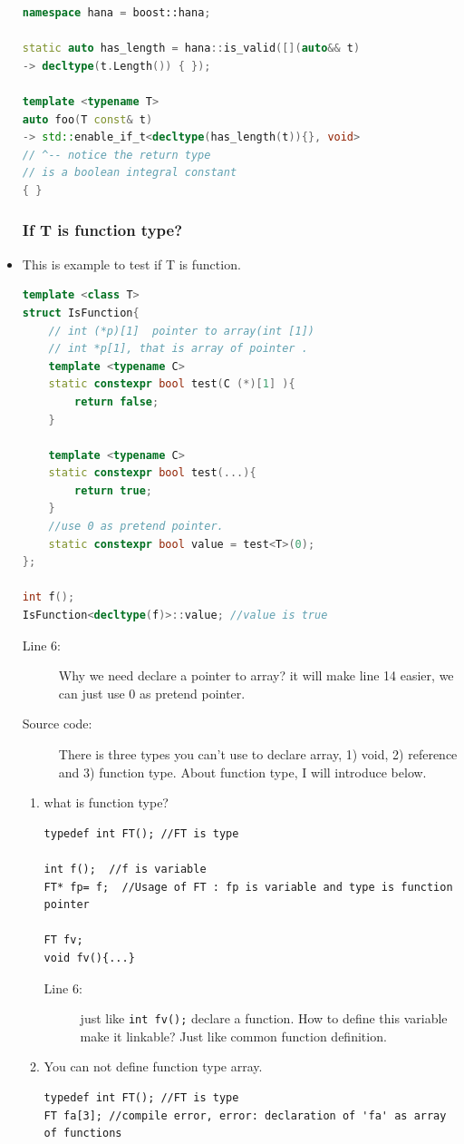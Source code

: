 \documentclass[a4paper,11pt,twoside]{book}
\begin{document}
\begin{itemize}
\begin{lstlisting}[frame=single, language=c++]
namespace hana = boost::hana;

static auto has_length = hana::is_valid([](auto&& t)
-> decltype(t.Length()) { });

template <typename T>
auto foo(T const& t)
-> std::enable_if_t<decltype(has_length(t)){}, void>
// ^-- notice the return type 
// is a boolean integral constant
{ }
\end{lstlisting}

\subsubsection{ If T is function type? }

\item This is example to test if T is function.
\begin{lstlisting}[frame=single, language=c++]
template <class T>
struct IsFunction{
	// int (*p)[1]  pointer to array(int [1])
	// int *p[1], that is array of pointer .
	template <typename C> 
	static constexpr bool test(C (*)[1] ){
		return false;
	}
	
	template <typename C> 
	static constexpr bool test(...){
		return true;
	}
	//use 0 as pretend pointer.
	static constexpr bool value = test<T>(0);
};

int f();
IsFunction<decltype(f)>::value; //value is true 
\end{lstlisting}
\begin{description}
	\item[Line 6:] Why we need declare a pointer to array? it will make line 14 easier, we can just use 0 as pretend pointer.
	\item[Source code:] There is three types you can't use to declare array, 1) void, 2) reference and 3) function type.  About function type, I will introduce below. 
\end{description}

\begin{enumerate}
	\item what is function type?
\begin{lstlisting}
typedef int FT(); //FT is type

int f();  //f is variable
FT* fp= f;  //Usage of FT : fp is variable and type is function pointer

FT fv; 
void fv(){...} 
\end{lstlisting}
	\begin{description}

		\item[Line 6:] just like \texttt{int fv();} declare a function. How to define this variable make it linkable? Just like common function definition.
	\end{description}
	
	\item You can not define function type array.
\begin{lstlisting}
typedef int FT(); //FT is type
FT fa[3]; //compile error, error: declaration of 'fa' as array of functions
\end{lstlisting}

\end{enumerate}
\end{itemize}
\end{document}
